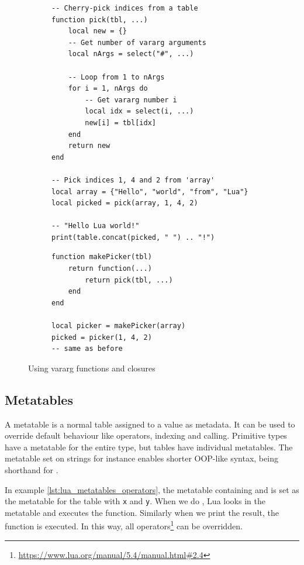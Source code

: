 \begin{figure}[ht]
\centering
\begin{subfigure}{0.55\textwidth}
\begin{verbatim}
-- Cherry-pick indices from a table
function pick(tbl, ...)
    local new = {}
    -- Get number of vararg arguments
    local nArgs = select("#", ...)
    
    -- Loop from 1 to nArgs
    for i = 1, nArgs do
        -- Get vararg number i
        local idx = select(i, ...)
        new[i] = tbl[idx]
    end
    return new
end

-- Pick indices 1, 4 and 2 from 'array'
local array = {"Hello", "world", "from", "Lua"}
local picked = pick(array, 1, 4, 2)

-- "Hello Lua world!"
print(table.concat(picked, " ") .. "!")
\end{verbatim}
\end{subfigure}
\begin{subfigure}[t]{0.44\textwidth}
\begin{verbatim}
function makePicker(tbl)
    return function(...)
        return pick(tbl, ...)
    end
end

local picker = makePicker(array)
picked = picker(1, 4, 2)
-- same as before
\end{verbatim}
\end{subfigure}
\caption{Using vararg functions and closures}
\label{lst:lua_vararg}
\end{figure}

\subsection{Metatables}
A metatable is a normal table assigned to a value as metadata. It can be used to override default behaviour like operators, indexing and calling. Primitive types have a metatable for the entire type, but tables have individual metatables. The metatable set on strings for instance enables shorter OOP-like syntax,  being shorthand for .

In example \ref{lst:lua_metatables_operators}, the metatable containing  and  is set as the metatable for the table with \texttt{x} and \texttt{y}. When we do , Lua looks in the metatable and executes the  function. Similarly when we print the result, the  function is executed. In this way, all operators\footnote{\url{https://www.lua.org/manual/5.4/manual.html\#2.4}} can be overridden.


